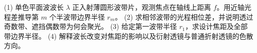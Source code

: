 (1) 单色平面波波长 \(\lambda\) 正入射薄圆形波带片，观测焦点在轴线上距离 \(f\)。用近轴光程差推导第 \(m\) 个半波带边界半径 \(r_m\)。
(2) 求相邻波带的光程相位差，并说明透过奇数带、遮挡偶数带为何会聚光。
(3) 给定第一波带半径 \(r_1\)，求设计焦距及全部带边界半径。
(4) 解释波长改变对焦距的影响以及衍射透镜与普通折射透镜的色散方向。
